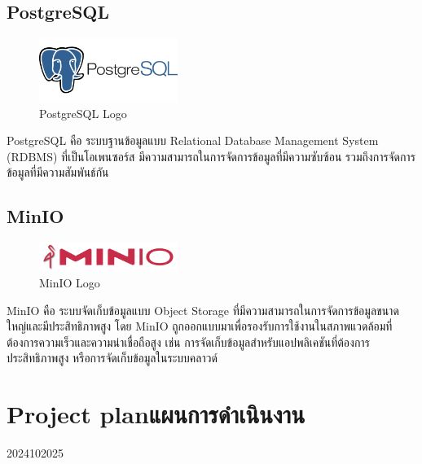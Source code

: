 \subsection{PostgreSQL}
    \begin{figure}[ht]
        \centering
        \includegraphics[width=0.4\textwidth, keepaspectratio]{image/Tools/postgresql-logo.png}
        \caption[PostgreSQL Logo]{PostgreSQL Logo\footnotemark}
        \label{fig:postgresql_logo}
    \end{figure}
    \FloatBarrier
\qquad PostgreSQL คือ ระบบฐานข้อมูลแบบ Relational Database Management System (RDBMS) ที่เป็นโอเพนซอร์ส มีความสามารถในการจัดการข้อมูลที่มีความซับซ้อน รวมถึงการจัดการข้อมูลที่มีความสัมพันธ์กัน

\subsection{MinIO}
    \begin{figure}[ht]
        \centering
        \includegraphics[width=0.4\textwidth, keepaspectratio]{image/Tools/minio-logo.png}
        \caption[MinIO Logo]{MinIO Logo\footnotemark}
        \label{fig:minio_logo}
    \end{figure}
    \FloatBarrier
\qquad MinIO คือ ระบบจัดเก็บข้อมูลแบบ Object Storage ที่มีความสามารถในการจัดการข้อมูลขนาดใหญ่และมีประสิทธิภาพสูง โดย MinIO ถูกออกแบบมาเพื่อรองรับการใช้งานในสภาพแวดล้อมที่ต้องการความเร็วและความน่าเชื่อถือสูง เช่น การจัดเก็บข้อมูลสำหรับแอปพลิเคชันที่ต้องการประสิทธิภาพสูง หรือการจัดเก็บข้อมูลในระบบคลาวด์

\section{\ifenglish Project plan\else แผนการดำเนินงาน\fi}

\begin{plan}{6}{2024}{10}{2025}
\end{plan}

